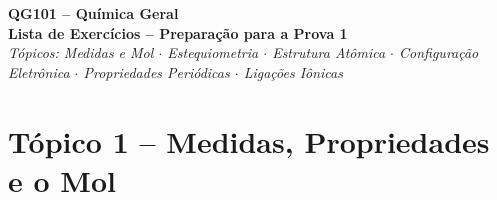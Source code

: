 \documentclass[10pt,a4paper]{article}
\begin{document}
\begin{center}
  {\LARGE\bfseries QG101 -- Química Geral}\\[4pt]
  {\large\bfseries Lista de Exercícios -- Preparação para a Prova 1}\\[2pt]
  \textit{Tópicos: Medidas e Mol $\cdot$ Estequiometria $\cdot$ Estrutura
  Atômica $\cdot$ Configuração Eletrônica $\cdot$ Propriedades Periódicas
  $\cdot$ Ligações Iônicas}
\end{center}

\bigskip

\section*{Tópico 1 \; -- \; Medidas, Propriedades e o Mol}
\end{document}
